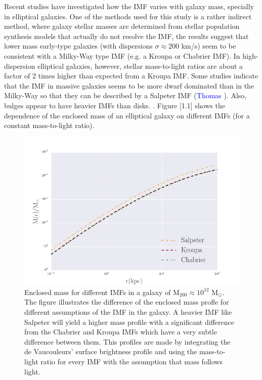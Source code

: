 Recent studies have investigated how the IMF varies with galaxy mass, specially in elliptical galaxies. One of the methods used for this study is a rather indirect method, where galaxy stellar masses are determined from stellar population synthesis models that actually do not resolve the IMF, the results suggest that lower mass early-type galaxies (with dispersions $\sigma \approx 200$ km/s) seem to be consistent with a Milky-Way type IMF (e.g. a Kroupa or Chabrier IMF). In high-dispersion elliptical galaxies, however, stellar mass-to-light ratios are about a factor of 2 times higher than expected from a Kroupa IMF. Some studies indicate that the IMF in massive galaxies seems to be more dwarf dominated than in the Milky-Way so that they can be described by a Salpeter IMF (\textcolor{blue}{Thomas} \citeyear{Reference28}). Also, bulges appear to have heavier IMFs than disks. . Figure [1.1] shows the dependence of the enclosed mass of an elliptical galaxy on different IMFs (for a constant mass-to-light ratio).

\begin{figure}[H]
\centering
\includegraphics[width=12cm]{images/Enclosed_Mass_IMFs.png}
\caption[Enclosed mass for different IMFs in a galaxy]{Enclosed mass for different IMFs in a galaxy of $\textrm{M}_{200}\approx 10^{12}$ $\textrm{M}_{\odot}$. The figure illustrates the difference of the enclosed mass profle for different assumptions of the IMF in the galaxy. A heavier IMF like Salpeter will yield a higher mass profile with a significant difference from the Chabrier and Kroupa IMFs which have a very subtle difference between them. This profiles are made by integrating the de Vaucouleurs' surface brightness profile and using the mass-to-light ratio for every IMF with the assumption that mass follows light.}
\end{figure}   

